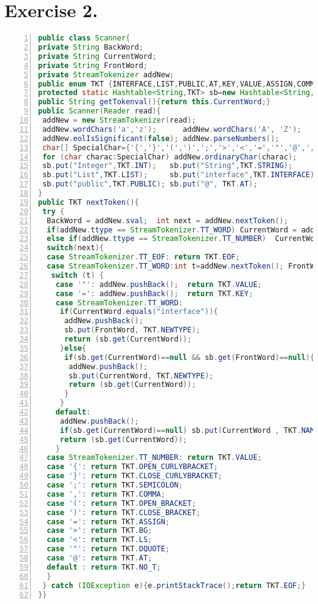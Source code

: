 \documentclass[10pt]{report}
\begin{document}
\section{Exercise 2.}
\label{ScannerClass}
\begin{lstlisting}[numbers=left,language=Java,frame=single,breaklines=true,label=Code:ReadGraph, caption=Scanner Class.]
public class Scanner{
private String BackWord;
private String CurrentWord;
private String FrontWord;
private StreamTokenizer addNew;	
public enum TKT {INTERFACE,LIST,PUBLIC,AT,KEY,VALUE,ASSIGN,COMMA,NEWTYPE,NULL,DQUOTE,SEMICOLON,OPEN_CURLYBRACKET,CLOSE_CURLYBRACKET,OPEN_BRACKET,CLOSE_BRACKET,INT,STRING,EOF,EOA,NO_T,BG,LS,NAME,NUMBER,};
protected static Hashtable<String,TKT> sb=new Hashtable<String,TKT>();
public String getTokenval(){return this.CurrentWord;}
public Scanner(Reader read){
 addNew = new StreamTokenizer(read);
 addNew.wordChars('a','z');      addNew.wordChars('A', 'Z'); 
 addNew.eolIsSignificant(false); addNew.parseNumbers();
 char[] SpecialChar={'{','}','(',')',';','>','<','=','"','@',','};
 for (char charac:SpecialChar) addNew.ordinaryChar(charac);
 sb.put("Integer",TKT.INT);   sb.put("String",TKT.STRING);
 sb.put("List",TKT.LIST);     sb.put("interface",TKT.INTERFACE);
 sb.put("public",TKT.PUBLIC); sb.put("@", TKT.AT);
}
public TKT nextToken(){
 try {
  BackWord = addNew.sval;  int next = addNew.nextToken();
  if(addNew.ttype == StreamTokenizer.TT_WORD) CurrentWord = addNew.sval;
  else if(addNew.ttype == StreamTokenizer.TT_NUMBER)  CurrentWord = String.valueOf(addNew.nval);
  switch(next){
  case StreamTokenizer.TT_EOF: return TKT.EOF;
  case StreamTokenizer.TT_WORD:int t=addNew.nextToken(); FrontWord=addNew.sval;
   switch (t) {
    case '"': addNew.pushBack();  return TKT.VALUE;
    case '=': addNew.pushBack();  return TKT.KEY;
    case StreamTokenizer.TT_WORD:
     if(CurrentWord.equals("interface")){
      addNew.pushBack();
      sb.put(FrontWord, TKT.NEWTYPE);
      return (sb.get(CurrentWord));
     }else{
      if(sb.get(CurrentWord)==null && sb.get(FrontWord)==null){
       addNew.pushBack();
       sb.put(CurrentWord, TKT.NEWTYPE);
       return (sb.get(CurrentWord));
      }
     }
    default:
     addNew.pushBack();
     if(sb.get(CurrentWord)==null) sb.put(CurrentWord , TKT.NAME);
     return (sb.get(CurrentWord));
    }
  case StreamTokenizer.TT_NUMBER: return TKT.VALUE;
  case '{': return TKT.OPEN_CURLYBRACKET;
  case '}': return TKT.CLOSE_CURLYBRACKET;
  case ';': return TKT.SEMICOLON;
  case ',': return TKT.COMMA;
  case '(': return TKT.OPEN_BRACKET;
  case ')': return TKT.CLOSE_BRACKET;
  case '=': return TKT.ASSIGN;
  case '>': return TKT.BG;
  case '<': return TKT.LS;
  case '"': return TKT.DQUOTE;
  case '@': return TKT.AT;
  default : return TKT.NO_T; 
  }
 } catch (IOException e){e.printStackTrace();return TKT.EOF;}
}}
\end{lstlisting}
\end{document}
